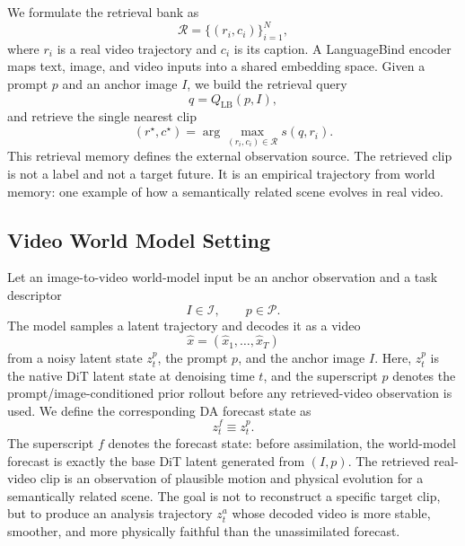 \documentclass{article}
\begin{document}
We formulate the retrieval bank as
\begin{equation}
    \mathcal{R} = \{(r_i, c_i)\}_{i=1}^{N},
\end{equation}
where $r_i$ is a real video trajectory and $c_i$ is its caption. A LanguageBind encoder \citep{languagebind2024} maps text, image, and video inputs into a shared embedding space. Given a prompt $p$ and an anchor image $I$, we build the retrieval query
\begin{equation}
    q = Q_{\mathrm{LB}}(p, I),
\end{equation}
and retrieve the single nearest clip
\begin{equation}
    (r^{\star}, c^{\star}) = \arg\max_{(r_i,c_i)\in \mathcal{R}} s(q,r_i).
\end{equation}
This retrieval memory defines the external observation source. The retrieved clip is not a label and not a target future. It is an empirical trajectory from world memory: one example of how a semantically related scene evolves in real video.

\subsection{Video World Model Setting}

Let an image-to-video world-model input be an anchor observation and a task descriptor
\begin{equation}
    I \in \mathcal{I}, \qquad p \in \mathcal{P}.
\end{equation}
The model samples a latent trajectory and decodes it as a video
\begin{equation}
    \hat{x} = (\hat{x}_1,\dots,\hat{x}_T)
\end{equation}
from a noisy latent state $z_t^{p}$, the prompt $p$, and the anchor image $I$. Here, $z_t^{p}$ is the native DiT latent state at denoising time $t$, and the superscript $p$ denotes the prompt/image-conditioned prior rollout before any retrieved-video observation is used. We define the corresponding DA forecast state as
\begin{equation}
    z_t^{f} \equiv z_t^{p}.
\end{equation}
The superscript $f$ denotes the forecast state: before assimilation, the world-model forecast is exactly the base DiT latent generated from $(I,p)$.
The retrieved real-video clip is an observation of plausible motion and physical evolution for a semantically related scene. The goal is not to reconstruct a specific target clip, but to produce an analysis trajectory $z_t^{a}$ whose decoded video is more stable, smoother, and more physically faithful than the unassimilated forecast.
\end{document}
